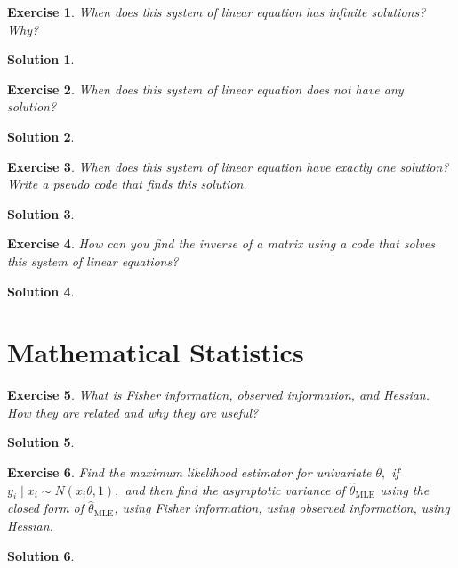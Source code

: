 \documentclass[12pt,a4paper]{article}
\newtheorem{exercise}{Exercise}
\numberwithin{exercise}{section} %
\newtheorem{solution}{Solution}
\numberwithin{solution}{section} %
\begin{document}
\begin{exercise}
When does this system of linear equation has infinite solutions? Why?
\end{exercise}

\begin{solution}
\end{solution}


\begin{exercise} 
When does this system of linear equation does not have any solution?
\end{exercise}

\begin{solution}
\end{solution}


%
\begin{exercise} 
When does this system of linear equation have exactly one solution? Write a pseudo code that finds this solution.
\end{exercise}

\begin{solution}
\end{solution}


\begin{exercise} 
How can you find the inverse of a matrix using a code that solves this system of linear equations? 
\end{exercise}

\begin{solution}
\end{solution}


\section{Mathematical Statistics}
\begin{exercise}
What is Fisher information, observed information, and Hessian. How they are related and why they are useful?
\end{exercise}

\begin{solution}
\end{solution}


\begin{exercise}
Find the maximum likelihood estimator for univariate $\theta,$ if $y_i\mid x_i \sim N(x_i\theta,1),$ and then find the asymptotic variance of  $\hat\theta_{\mathrm{MLE}}$ using the closed form of $\hat\theta_{\mathrm{MLE}}$, using Fisher information, using observed information, using Hessian.
\end{exercise}

\begin{solution}
\end{solution}
\end{document}
